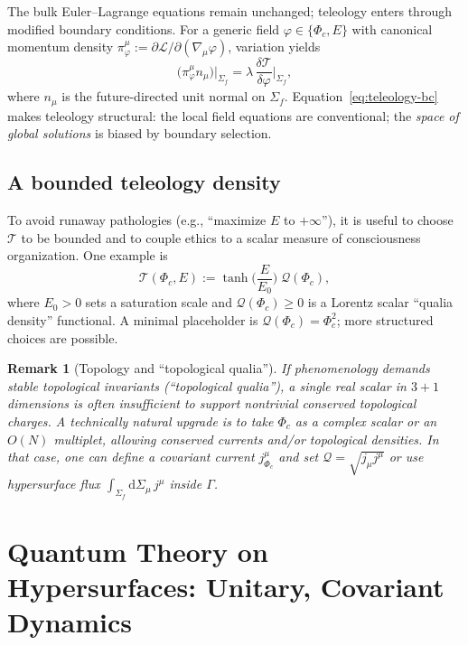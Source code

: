 \documentclass[reprint,amsmath,amssymb,aps,showkeys]{revtex4-2}
\newtheorem{remark}{Remark}
\newcommand{\dd}{\mathrm{d}}
\newcommand{\Lag}{\mathcal{L}}
\newcommand{\cT}{\mathcal{T}}
\newcommand{\cQ}{\mathcal{Q}}
\begin{document}
The bulk Euler--Lagrange equations remain unchanged; teleology enters through modified boundary conditions. For a generic field $\varphi\in\{\Phi_c,E\}$ with canonical momentum density $\pi_\varphi^{\mu}:=\partial\Lag/\partial(\nabla_{\mu}\varphi)$, variation yields
\begin{equation}
\big(\pi_\varphi^{\mu} n_{\mu}\big)\big|_{\Sigma_f} = \lambda\,\frac{\delta\cT}{\delta\varphi}\Big|_{\Sigma_f},
\label{eq:teleology-bc}
\end{equation}
where $n_{\mu}$ is the future-directed unit normal on $\Sigma_f$. Equation~\eqref{eq:teleology-bc} makes teleology structural: the local field equations are conventional; the \emph{space of global solutions} is biased by boundary selection.

\subsection{A bounded teleology density}
To avoid runaway pathologies (e.g., ``maximize $E$ to $+\infty$''), it is useful to choose $\cT$ to be bounded and to couple ethics to a scalar measure of consciousness organization. One example is
\begin{equation}
\cT(\Phi_c,E) := \tanh\!\Big(\frac{E}{E_0}\Big)\;\cQ(\Phi_c),
\label{eq:Tchoice}
\end{equation}
where $E_0>0$ sets a saturation scale and $\cQ(\Phi_c)\ge 0$ is a Lorentz scalar ``qualia density'' functional. A minimal placeholder is $\cQ(\Phi_c)=\Phi_c^2$; more structured choices are possible.

\begin{remark}[Topology and ``topological qualia'']\label{rem:topology}
If phenomenology demands stable topological invariants (``topological qualia''), a single real scalar in $3+1$ dimensions is often insufficient to support nontrivial conserved topological charges. A technically natural upgrade is to take $\Phi_c$ as a complex scalar or an $O(N)$ multiplet, allowing conserved currents and/or topological densities. In that case, one can define a covariant current $j_{\Phi_c}^{\mu}$ and set $\cQ=\sqrt{j_{\mu}j^{\mu}}$ or use hypersurface flux $\int_{\Sigma_f}\dd\Sigma_{\mu}\,j^{\mu}$ inside $\Gamma$.
\end{remark}

\section{Quantum Theory on Hypersurfaces: Unitary, Covariant Dynamics}
\end{document}
